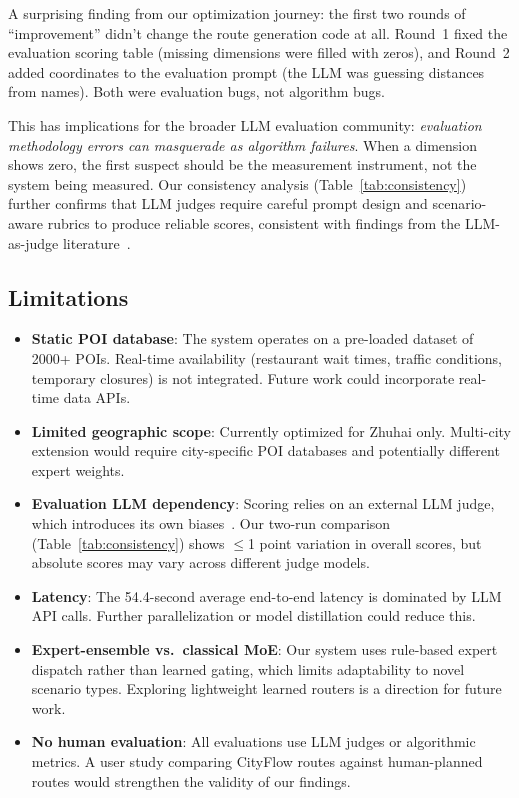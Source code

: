 A surprising finding from our optimization journey: the first two rounds of ``improvement'' didn't change the route generation code at all. Round~1 fixed the evaluation scoring table (missing dimensions were filled with zeros), and Round~2 added coordinates to the evaluation prompt (the LLM was guessing distances from names). Both were evaluation bugs, not algorithm bugs.

This has implications for the broader LLM evaluation community: \textit{evaluation methodology errors can masquerade as algorithm failures}. When a dimension shows zero, the first suspect should be the measurement instrument, not the system being measured. Our consistency analysis (Table~\ref{tab:consistency}) further confirms that LLM judges require careful prompt design and scenario-aware rubrics to produce reliable scores, consistent with findings from the LLM-as-judge literature~\cite{gu2024llmjudge}.

\subsection{Limitations}

\begin{itemize}[leftmargin=*]
    \item \textbf{Static POI database}: The system operates on a pre-loaded dataset of 2000+ POIs. Real-time availability (restaurant wait times, traffic conditions, temporary closures) is not integrated. Future work could incorporate real-time data APIs.
    \item \textbf{Limited geographic scope}: Currently optimized for Zhuhai only. Multi-city extension would require city-specific POI databases and potentially different expert weights.
    \item \textbf{Evaluation LLM dependency}: Scoring relies on an external LLM judge, which introduces its own biases~\cite{gu2024llmjudge}. Our two-run comparison (Table~\ref{tab:consistency}) shows $\leq$1 point variation in overall scores, but absolute scores may vary across different judge models.
    \item \textbf{Latency}: The 54.4-second average end-to-end latency is dominated by LLM API calls. Further parallelization or model distillation could reduce this.
    \item \textbf{Expert-ensemble vs.\ classical MoE}: Our system uses rule-based expert dispatch rather than learned gating, which limits adaptability to novel scenario types. Exploring lightweight learned routers is a direction for future work.
    \item \textbf{No human evaluation}: All evaluations use LLM judges or algorithmic metrics. A user study comparing CityFlow routes against human-planned routes would strengthen the validity of our findings.
\end{itemize}

